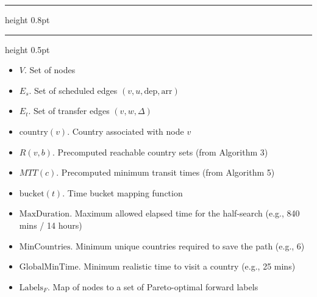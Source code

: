 \documentclass{article}
\begin{document}
\pagestyle{empty}
\allowdisplaybreaks[1] 
\setcounter{page}{1}


\setcounter{algorithm}{9}
\begin{center}
    \hrule height 0.8pt
    \vspace{0.3em}
    \label{alg:bounded_forward_half_search}
    \vspace{0.2em}
    \hrule height 0.5pt
\end{center}

\begin{algorithmic}[1] %
    
    \Input
    \begin{itemize}
        \item $V$. Set of nodes
        \item $E_s$. Set of scheduled edges $(v,u,\text{dep},\text{arr})$
        \item $E_t$. Set of transfer edges $(v,w,\Delta)$
        \item $\text{country}(v)$. Country associated with node $v$
        \item $R(v,b)$. Precomputed reachable country sets (from Algorithm 3)
        \item $MTT(c)$. Precomputed minimum transit times (from Algorithm 5)
        \item $\text{bucket}(t)$. Time bucket mapping function
        \item $\text{MaxDuration}$. Maximum allowed elapsed time for the half-search (e.g., 840 mins / 14 hours)
        \item $\text{MinCountries}$. Minimum unique countries required to save the path (e.g., 6)
        \item $\text{GlobalMinTime}$. Minimum realistic time to visit a country (e.g., 25 mins)
    \end{itemize}

    \Output
    \begin{itemize}
        \item $\text{Labels}_F$. Map of nodes to a set of Pareto-optimal forward labels
    \end{itemize}
    \vspace{0.5em} 


\end{algorithmic}
\end{document}
